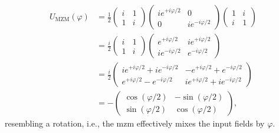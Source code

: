 \begin{align}
    U_\text{MZM}(\varphi)
    &=
    \frac{1}{2}
    \begin{pmatrix}
        i & 1
        \\
        1 & i
    \end{pmatrix}
    \begin{pmatrix}
        ie^{+i\varphi/2} & 0
        \\
        0 & ie^{-i\varphi/2}
    \end{pmatrix}
    \begin{pmatrix}
        1 & i
        \\
        i & 1
    \end{pmatrix}
    \\
    &=
    \frac{i}{2}
    \begin{pmatrix}
        i & 1
        \\
        1 & i
    \end{pmatrix}
    \begin{pmatrix}
        e^{+i\varphi/2} & ie^{+i\varphi/2}
        \\
        ie^{-i\varphi/2} & e^{-i\varphi/2}
    \end{pmatrix}
    \\
    &=
    \frac{i}{2}
    \begin{pmatrix}
        ie^{+i\varphi/2}+ie^{-i\varphi/2} & -e^{+i\varphi/2}+e^{-i\varphi/2}
        \\
        e^{+i\varphi/2}-e^{-i\varphi/2} & ie^{+i\varphi/2}+ie^{-i\varphi/2}
    \end{pmatrix}
    \\
    &=
    -
    \begin{pmatrix}
        \cos(\varphi/2) & -\sin(\varphi/2)
        \\
        \sin(\varphi/2) & \cos(\varphi/2)
    \end{pmatrix}
    \label{eq:mzm_rotation},
\end{align}
resembling a rotation, i.e., the \gls{mzm} effectively mixes the input fields by $\varphi$.

